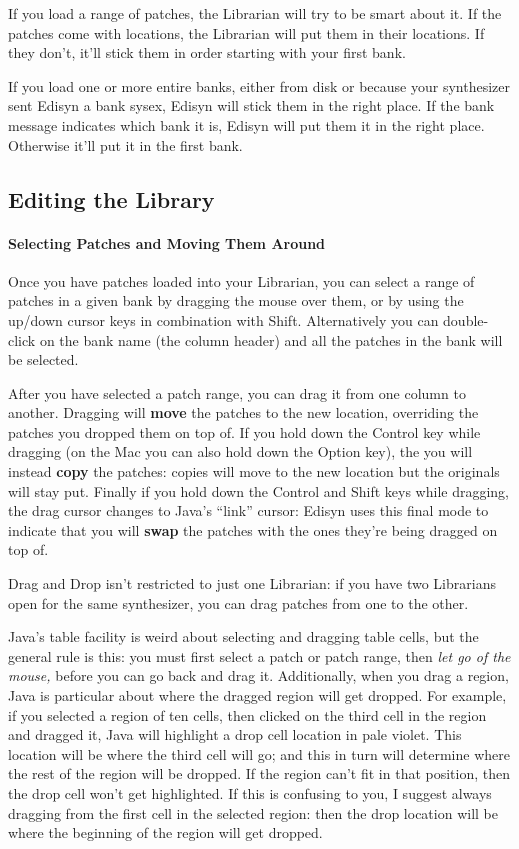 \documentclass{article}
\begin{document}
If you load a range of patches, the Librarian will try to be smart about it.  If the patches come with locations, the Librarian will put them in their locations.  If they don't, it'll stick them in order starting with your first bank.  

If you load one or more entire banks, either from disk or because your synthesizer sent Edisyn a bank sysex, Edisyn will stick them in the right place.  If the bank message indicates which bank it is, Edisyn will put them it in the right place.  Otherwise it'll put it in the first bank.



\subsection{Editing the Library} 

\paragraph{Selecting Patches and Moving Them Around}

Once you have patches loaded into your Librarian, you can select a range of patches in a given bank by dragging the mouse over them, or by using the up/down cursor keys in combination with Shift.  Alternatively you can double-click on the bank name (the column header) and all the patches in the bank will be selected.

After you have selected a patch range, you can drag it from one column to another.  Dragging will {\bf move} the patches to the new location, overriding the patches you dropped them on top of.  If you hold down the Control key while dragging (on the Mac you can also hold down the Option key), the you will instead {\bf copy} the patches: copies will move to the new location but the originals will stay put.  Finally if you hold down the Control and Shift keys while dragging, the drag cursor changes to Java's ``link'' cursor:   Edisyn uses this final mode to indicate that you will {\bf swap} the patches with the ones they're being dragged on top of.

Drag and Drop isn't restricted to just one Librarian: if you have two Librarians open for the same synthesizer, you can drag patches from one to the other. 

Java's table facility is weird about selecting and dragging table cells, but the general rule is this: you must first select a patch or patch range, then {\it let go of the mouse,} before you can go back and drag it. Additionally, when you drag a region, Java is particular about where the dragged region will get dropped.  For example, if you selected a region of ten cells, then clicked on the third cell in the region and dragged it, Java will highlight a drop cell location in pale violet.  This location will be where the third cell will go; and this in turn will determine where the rest of the region will be dropped.   If the region can't fit in that position, then the drop cell won't get highlighted.  If this is confusing to you, I suggest always dragging from the first cell in the selected region: then the drop location will be where the beginning of the region will get dropped.
\end{document}

